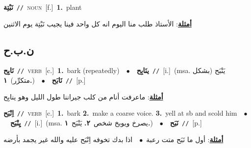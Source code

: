 \documentclass[10pt,a4paper,twoside]{article} %
\begin{document}
\begin{multicols}{2}
{{{\setlength\topsep{0pt}\textbf{\foreignlanguage{arabic}{نَبْتِة}}\ {\color{gray}\texttt{//}\color{black}}\ \textsc{noun}\ [f.]\ \textbf{1.}~plant\  \begin{flushright}\color{gray}\foreignlanguage{arabic}{\textbf{\underline{\foreignlanguage{arabic}{أمثلة}}}: الأستاذ طلب منا اليوم انه كل واحد فينا يجيب نَبْتِة يوم الاثنين}\end{flushright}\color{black}} \vspace{2mm}

\vspace{-3mm}
\subsection*{\color{blue}\foreignlanguage{arabic}{ن.ب.ح}\color{blue}{}} 

{\setlength\topsep{0pt}\textbf{\foreignlanguage{arabic}{نَابِح}}\ {\color{gray}\texttt{//}\color{black}}\ \textsc{verb}\ [c.]\ \textbf{1.}~bark (repeatedly)\ \ $\bullet$\ \ \setlength\topsep{0pt}\textbf{\foreignlanguage{arabic}{ينَابِح}}\ {\color{gray}\texttt{//}\color{black}}\ [i.]\ \color{gray}(msa. \foreignlanguage{arabic}{يَنْبَح (بشكل متكرِّر)}~\foreignlanguage{arabic}{\textbf{١.}})\color{black}\ \ $\bullet$\ \ \setlength\topsep{0pt}\textbf{\foreignlanguage{arabic}{نَابَح}}\ {\color{gray}\texttt{//}\color{black}}\ [p.]\  \begin{flushright}\color{gray}\foreignlanguage{arabic}{\textbf{\underline{\foreignlanguage{arabic}{أمثلة}}}: ماعرفت أنام من كلب جيراننا طول الليل وهو ينابِح}\end{flushright}\color{black}} \vspace{2mm}

{\setlength\topsep{0pt}\textbf{\foreignlanguage{arabic}{اِنْبَح}}\ {\color{gray}\texttt{//}\color{black}}\ \textsc{verb}\ [c.]\ \textbf{1.}~bark  \textbf{2.}~make a coarse voice.  \textbf{3.}~yell at sb and scold him\ \ $\bullet$\ \ \setlength\topsep{0pt}\textbf{\foreignlanguage{arabic}{يِنْبَح}}\ {\color{gray}\texttt{//}\color{black}}\ [i.]\ \color{gray}(msa. \foreignlanguage{arabic}{يصرخ ويوبخ شخص}~\foreignlanguage{arabic}{\textbf{٢.}}  \foreignlanguage{arabic}{يَنْبَح}~\foreignlanguage{arabic}{\textbf{١.}})\color{black}\ \ $\bullet$\ \ \setlength\topsep{0pt}\textbf{\foreignlanguage{arabic}{نَبَح}}\ {\color{gray}\texttt{//}\color{black}}\ [p.]\  \begin{flushright}\color{gray}\foreignlanguage{arabic}{\textbf{\underline{\foreignlanguage{arabic}{أمثلة}}}: أول ما نَبَح متت رعبة\ $\bullet$\ \  اذا بدك تخوفه اِنْبَح عليه والله غير يجمد بأرضه}\end{flushright}\color{black}} \vspace{2mm}

}}
\end{multicols}
\end{document}
